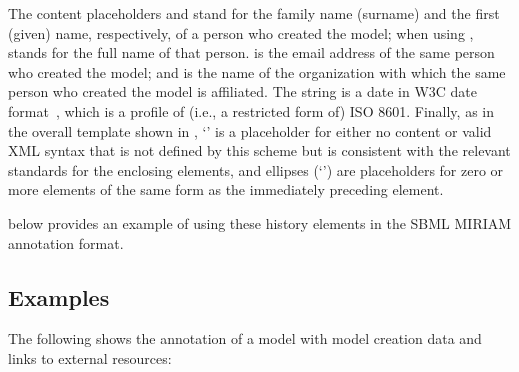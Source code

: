 The content placeholders \familyName and \givenName stand for the
family name (surname) and the first (given) name, respectively, of
a person who created the model; when using , \fullName stands for the full name of that person.  \emailAddress is the email address
of the same person who created the model; and \orgName is the name
of the organization with which the same person who created the
model is affiliated.  The string \historyDate is a date in W3C
date format~\citep{wolf:1998}, which is a profile of (i.e., a
restricted form of) ISO 8601.  Finally, as in the overall template
shown in , `\otherContent' is
a placeholder for either no content or valid XML syntax that is
not defined by this scheme but is consistent with the relevant
standards for the enclosing elements, and ellipses
(`\moreOfTheSame') are placeholders for zero or more elements of
the same form as the immediately preceding element.

 below provides an example of
using these history elements in the SBML MIRIAM annotation format.


\subsection{Examples}
\label{sec:annotation-examples}

The following shows the annotation of a model with model creation
data and links to external resources:

